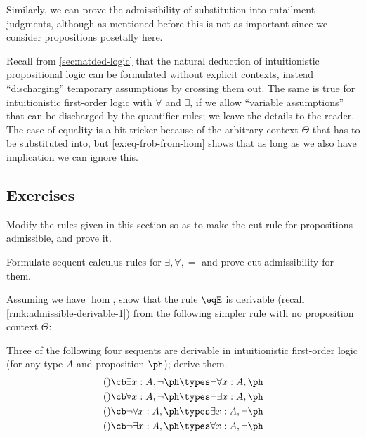 Similarly, we can prove the admissibility of substitution into entailment judgments, although as mentioned before this is not as important since we consider propositions posetally here.

\begin{rmk}
  Recall from \cref{sec:natded-logic} that the natural deduction of intuitionistic propositional logic can be formulated without explicit contexts, instead ``discharging'' temporary assumptions by crossing them out.
  The same is true for intuitionistic first-order logic with $\forall$ and $\exists$, if we allow ``variable assumptions'' that can be discharged by the quantifier rules; we leave the details to the reader.
  The case of equality is a bit tricker because of the arbitrary context $\Theta$ that has to be substituted into, but \cref{ex:eq-frob-from-hom} shows that as long as we also have implication we can ignore this.
\end{rmk}

\newpage

\subsection*{Exercises}

\begin{ex}\label{ex:fol:cutadm}
  Modify the rules given in this section so as to make the cut rule for propositions admissible, and prove it.
\end{ex}

\begin{ex}\label{ex:fol-seqcalc}
  Formulate sequent calculus rules for $\exists,\forall,=$ and prove cut admissibility for them.
\end{ex}

\begin{ex}\label{ex:eq-frob-from-hom}
  Assuming we have $\hom$, show that the rule $\eqE$ is derivable (recall \cref{rmk:admissible-derivable-1}) from the following simpler rule with no proposition context $\Theta$:
  \begin{mathpar}
  \end{mathpar}
\end{ex}

\begin{ex}\label{ex:quantifier-laws}
  Three of the following four sequents are derivable in intuitionistic first-order logic (for any type $A$ and proposition $\ph$); derive them.
  \begin{align*}
    () \cb \exists x:A, \neg \ph &\types \neg\forall x:A, \ph\\
    () \cb \forall x:A, \neg \ph &\types \neg\exists x:A, \ph\\
    () \cb \neg\forall x:A, \ph &\types \exists x:A, \neg \ph\\
    () \cb \neg\exists x:A, \ph &\types \forall x:A, \neg \ph
  \end{align*}
\end{ex}

